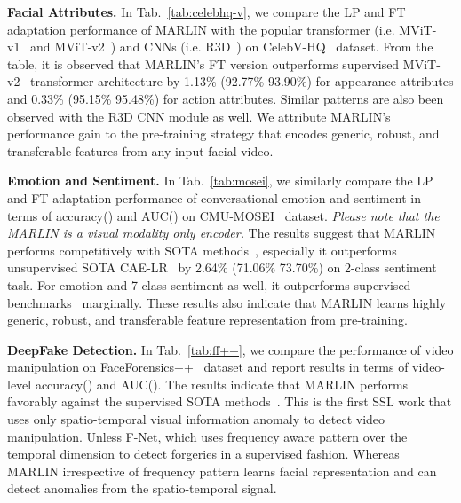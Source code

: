 \documentclass[10pt,twocolumn,letterpaper]{article}
\begin{document}
\noindent \textbf{Facial Attributes.} In Tab.~\ref{tab:celebhq-v}, we compare the LP and FT adaptation performance of MARLIN with the popular transformer (i.e. MViT-v1~\cite{fanMultiscale2021} and MViT-v2~\cite{liMViTv22022}) and CNNs (i.e. R3D~\cite{tranCloser2018}) on CelebV-HQ~\cite{zhuCelebVHQ2022} dataset. From the table, it is observed that MARLIN's FT version outperforms supervised MViT-v2~\cite{liMViTv22022} transformer architecture by 1.13\% (92.77\%  93.90\%) for appearance attributes and 0.33\% (95.15\%  95.48\%) for action attributes. Similar patterns are also been observed with the R3D CNN module as well. We attribute MARLIN's performance gain to the pre-training strategy that encodes generic, robust, and transferable features from any input facial video.

\noindent \textbf{Emotion and Sentiment.} In Tab.~\ref{tab:mosei}, we similarly compare the LP and FT adaptation performance of conversational emotion and sentiment in terms of accuracy() and AUC() on CMU-MOSEI~\cite{zadehMultiattention2018a} dataset. \textit{Please note that the MARLIN is a visual modality only encoder.} The results suggest that MARLIN performs competitively with SOTA methods~\cite{koromilasUnsupervised2022,liMViTv22022,delbrouckTransformerbased2020}, especially it outperforms unsupervised SOTA CAE-LR~\cite{koromilasUnsupervised2022} by 2.64\% (71.06\%  73.70\%) on 2-class sentiment task. For emotion and 7-class sentiment as well, it outperforms supervised benchmarks~\cite{liMViTv22022} marginally. These results also indicate that MARLIN learns highly generic, robust, and transferable feature representation from pre-training.

\noindent \textbf{DeepFake Detection.} In Tab.~\ref{tab:ff++}, we compare the performance of video manipulation on FaceForensics++~\cite{rosslerFaceForensics2019} dataset and report results in terms of video-level accuracy() and AUC(). The results indicate that MARLIN performs favorably against the supervised SOTA methods~\cite{afcharMesoNet2018,fridrichRich2012,cozzolinoRecasting2017,bayarDeep2016,rahmouniDistinguishing2017,liFace2020,cholletXception2017,qiuLearning2017,tranCloser2018,carreiraQuo2017}. This is the first SSL work that uses only spatio-temporal visual information anomaly to detect video manipulation. Unless F-Net, which uses frequency aware pattern over the temporal dimension to detect forgeries in a supervised fashion. Whereas MARLIN irrespective of frequency pattern learns facial representation and can detect anomalies from the spatio-temporal signal.
\end{document}
